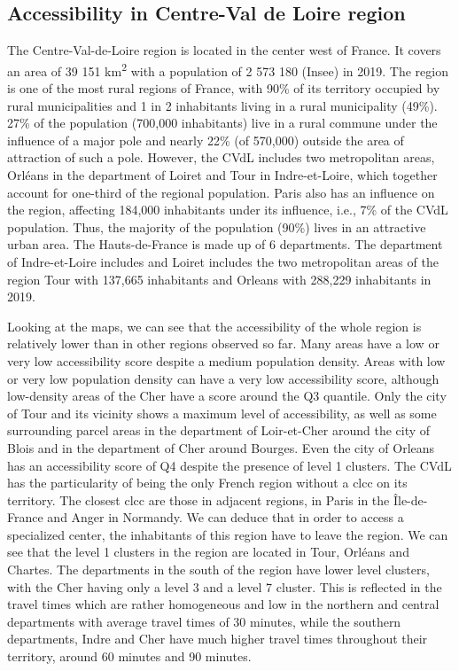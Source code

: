 \subsection*{Accessibility in Centre-Val de Loire region}

The Centre-Val-de-Loire region is located in the center west of France. It
covers an area of 39 151 km\textsuperscript{2} with a population of 2 573 180
(Insee) in 2019. The region is one of the most rural regions of France, with
90\% of its territory occupied by rural municipalities and 1 in 2 inhabitants
living in a rural municipality (49\%). 27\% of the population (700,000
inhabitants) live in a rural commune under the influence of a major pole and
nearly 22\% (of 570,000) outside the area of attraction of such a pole. However,
the CVdL includes two metropolitan areas, Orléans in the department of Loiret
and Tour in Indre-et-Loire, which together account for one-third of the regional
population. Paris also has an influence on the region, affecting 184,000
inhabitants under its influence, i.e., 7\% of the CVdL population. Thus, the
majority of the population (90\%) lives in an attractive urban area. The
Hauts-de-France is made up of 6 departments. The department of Indre-et-Loire
includes and Loiret includes the two metropolitan areas of the region Tour with
137,665 inhabitants and Orleans with 288,229 inhabitants in 2019.

Looking at the maps, we can see that the accessibility of the whole region is
relatively lower than in other regions observed so far. Many areas have a low or
very low accessibility score despite a medium population density. Areas with low
or very low population density can have a very low accessibility score, although
low-density areas of the Cher have a score around the Q3 quantile. Only the city
of Tour and its vicinity shows a maximum level of accessibility, as well as some
surrounding parcel areas in the department of Loir-et-Cher around the city of
Blois and in the department of Cher around Bourges. Even the city of Orleans has
an accessibility score of Q4 despite the presence of level 1 clusters. The CVdL
has the particularity of being the only French region without a \ac{clcc} on its
territory. The closest \ac{clcc} are those in adjacent regions, in Paris in the
Île-de-France and Anger in Normandy. We can deduce that in order to access a
specialized center, the inhabitants of this region have to leave the region.  We
can see that the level 1 clusters in the region are located in Tour, Orléans and
Chartes. The departments in the south of the region have lower level clusters,
with the Cher having only a level 3 and a level 7 cluster. This is reflected in
the travel times which are rather homogeneous and low in the northern and
central departments with average travel times of 30 minutes, while the southern
departments, Indre and Cher have much higher travel times throughout their
territory, around 60 minutes and 90 minutes.

